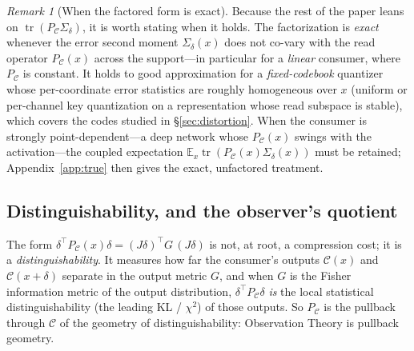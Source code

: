 \documentclass[lettersize,onecolumn]{IEEEtran}
\theoremstyle{definition}
\theoremstyle{remark}
\newtheorem*{remark}{Remark}
\newcommand{\PC}{P_{\mathcal{C}}}
\newcommand{\Sd}{\Sigma_{\delta}}
\newcommand{\tr}{\operatorname{tr}}
\newcommand{\E}{\mathbb{E}}
\begin{document}
\begin{remark}[When the factored form is exact]\label{rem:factored}
Because the rest of the paper leans on $\tr(\PC\Sd)$, it is worth stating when it
holds. The factorization is \emph{exact} whenever the error second moment $\Sd(x)$
does not co-vary with the read operator $\PC(x)$ across the support---in particular for
a \emph{linear} consumer, where $\PC$ is constant. It holds to good approximation for
a \emph{fixed-codebook} quantizer whose per-coordinate error statistics are roughly
homogeneous over $x$ (uniform or per-channel key quantization on a representation whose
read subspace is stable), which covers the codes studied in \S\ref{sec:distortion}.
When the consumer is strongly point-dependent---a deep network whose $\PC(x)$ swings
with the activation---the coupled expectation $\E_x\tr(\PC(x)\Sd(x))$ must be retained;
Appendix~\ref{app:true} then gives the exact, unfactored treatment.
\end{remark}

\subsection*{Distinguishability, and the observer's quotient}

The form $\delta^\top\PC(x)\delta=(J\delta)^\top G\,(J\delta)$ is not, at root, a
compression cost; it is a \emph{distinguishability}. It measures how far the
consumer's outputs $\mathcal{C}(x)$ and $\mathcal{C}(x{+}\delta)$ separate in the
output metric $G$, and when $G$ is the Fisher information metric of the output
distribution, $\delta^\top\PC\delta$ \emph{is} the local statistical
distinguishability (the leading KL / $\chi^2$) of those outputs. So $\PC$ is the
pullback through $\mathcal{C}$ of the geometry of distinguishability: Observation
Theory is pullback geometry.
\end{document}
